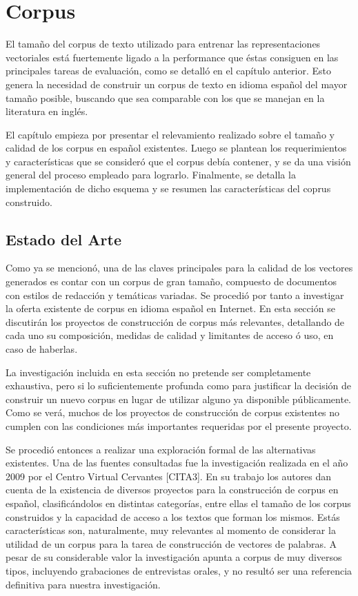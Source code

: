 \chapter{Corpus}

El tamaño del corpus de texto utilizado para entrenar las representaciones vectoriales está
fuertemente ligado a la performance que éstas consiguen en las principales tareas de evaluación,
como se detalló en el capítulo anterior. Esto genera la necesidad de construir un corpus de texto en
idioma español del mayor tamaño posible, buscando que sea comparable con los que se manejan en la
literatura en inglés.

El capítulo empieza por presentar el relevamiento realizado sobre el tamaño y calidad de los corpus
en español existentes. Luego se plantean los requerimientos y características que se consideró que
el corpus debía contener, y se da una visión general del proceso empleado para lograrlo. Finalmente,
se detalla la implementación de dicho esquema y se resumen las características del coprus
construido.

\section{Estado del Arte}

Como ya se mencionó, una de las claves principales para la calidad de los vectores generados es contar
con un corpus de gran tamaño, compuesto de documentos con estilos de redacción y temáticas variadas.
Se procedió por tanto a investigar la oferta existente de corpus en idioma español en Internet. En esta
sección se discutirán los proyectos de construcción de corpus más relevantes, detallando de cada uno su
composición, medidas de calidad y limitantes de acceso ó uso, en caso de haberlas.

La investigación incluida en esta sección no pretende ser completamente exhaustiva, pero si lo
suficientemente profunda como para justificar la decisión de construir un nuevo corpus en lugar de
utilizar alguno ya disponible públicamente. Como se verá, muchos de los proyectos de construcción de
corpus existentes no cumplen con las condiciones más importantes requeridas por el presente proyecto.

Se procedió entonces a realizar una exploración formal de las alternativas existentes. Una de las
fuentes consultadas fue la investigación realizada en el año 2009 por el Centro Virtual Cervantes [CITA3].
En su trabajo los autores dan cuenta de la existencia de diversos proyectos para la construcción de corpus
en español, clasificándolos en distintas categorías, entre ellas el tamaño de los corpus construidos y la
capacidad de acceso a los textos que forman los mismos. Estás características son, naturalmente, muy
relevantes al momento de considerar la utilidad de un corpus para la tarea de construcción de vectores de
palabras. A pesar de su considerable valor la investigación apunta a corpus de muy diversos tipos,
incluyendo grabaciones de entrevistas orales, y no resultó ser una referencia definitiva para nuestra
investigación.

